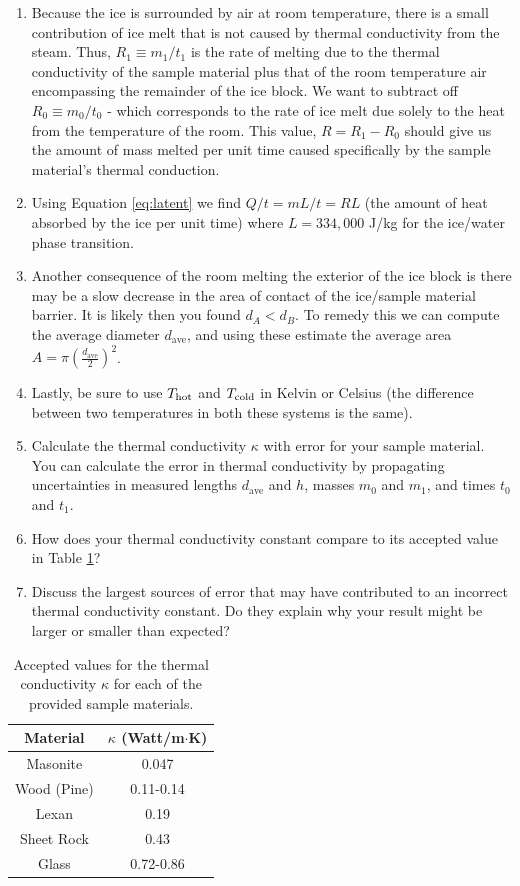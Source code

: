 \begin{enumerate}
\begin{enumerate}
		\item Because the ice is surrounded by air at room temperature, there is a small contribution of ice melt that is not caused by thermal conductivity from the steam.  Thus, $R_{1} \equiv m_{1}/t_{1}$ is the rate of melting due to the thermal conductivity of the sample material plus that of the room temperature air encompassing the remainder of the ice block.  We want to subtract off $R_{0} \equiv m_{0}/t_{0}$ - which corresponds to the rate of ice melt due solely to the heat from the temperature of the room.  This value, $R = R_{1} - R_{0}$ should give us the amount of mass melted per unit time caused specifically by the sample material's thermal conduction.
		\item Using Equation \ref{eq:latent} we find $Q/t = mL/t = RL$ (the amount of heat absorbed by the ice per unit time) where $L = 334,000$ J/kg for the ice/water phase transition.
		\item Another consequence of the room melting the exterior of the ice block is there may be a slow decrease in the area of contact of the ice/sample material barrier.  It is likely then you found $d_A < d_B$.  To remedy this we can compute the average diameter $d_\text{ave}$, and using these estimate the average area $A =\pi \left ( \frac{d_\text{ave}}{2}\right )^2$.
		\item Lastly, be sure to use $T_{\rm hot}$ and $T_{\rm cold}$ in Kelvin or Celsius (the difference between two temperatures in both these systems is the same).  
\item Calculate the thermal conductivity $\kappa$ with error for your sample material. You can calculate the error in thermal conductivity by propagating uncertainties in measured lengths $d_\text{ave}$ and $h$, masses $m_0$ and $m_1$, and times $t_0$ and $t_1$. 
\item  How does your thermal conductivity constant compare to its accepted value in Table \ref{kvalues}? 
\item  Discuss the largest sources of error that may have contributed to an incorrect thermal conductivity constant. Do they explain why your result might be larger or smaller than expected?


	\end{enumerate}
	\begin{table}
	\begin{center}
	\begin{tabular}{| c | c |}
	\hline
	Material & $\kappa$ (Watt/m$\cdot$K) \\
	\hline
	Masonite & 0.047 \\
	Wood (Pine) & 0.11-0.14 \\
	Lexan & 0.19 \\
	Sheet Rock & 0.43 \\
	Glass & 0.72-0.86 \\
	\hline
	\end{tabular}
	\end{center}
	\vspace{-0.5 cm}
	\caption{Accepted values for the thermal conductivity $\kappa$ for each of the provided sample materials.}
	\label{kvalues}
	\end{table}
\end{enumerate}

